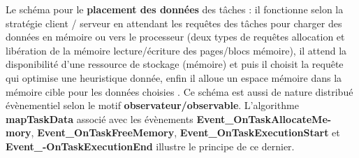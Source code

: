 Le schéma pour le \textbf{placement des données} des tâches : il fonctionne selon la stratégie client / serveur en attendant les requêtes des tâches pour charger des données en mémoire ou vers le processeur (deux types de requêtes allocation et libération de la mémoire lecture/écriture des pages/blocs mémoire), il attend la disponibilité d'une ressource de stockage (mémoire) et puis il choisit la requête qui optimise une heuristique donnée, enfin il alloue un espace mémoire dans la mémoire cible pour les données choisies . Ce schéma est aussi de nature distribué évènementiel selon le motif \textbf{observateur/observable}. L'algorithme \textbf{mapTaskData} associé avec les évènements \textbf{Event\_OnTaskAllocateMe-mory}, \textbf{Event\_OnTaskFreeMemory}, \textbf{Event\_OnTaskExecutionStart} et \textbf{Event\_-OnTaskExecutionEnd} illustre le principe de ce dernier.

